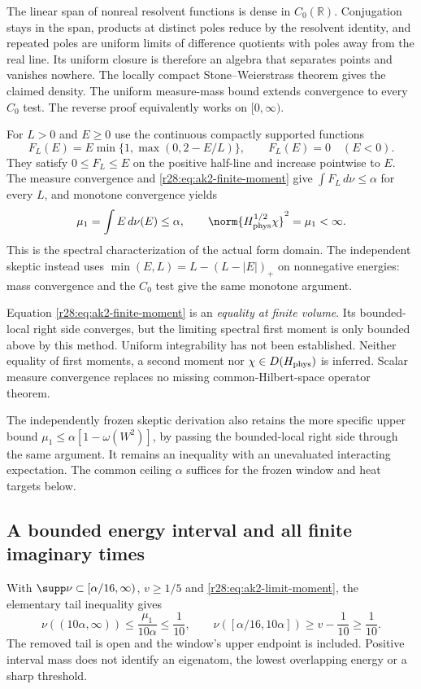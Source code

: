 The linear span of nonreal resolvent functions is dense in $C_0(\mathbb R)$. Conjugation stays in the span, products at distinct poles reduce by the resolvent identity, and repeated poles are uniform limits of difference quotients with poles away from the real line. Its uniform closure is therefore an algebra that separates points and vanishes nowhere. The locally compact Stone--Weierstrass theorem gives the claimed density. The uniform measure-mass bound extends convergence to every $C_0$ test. The reverse proof equivalently works on $[0,\infty)$.

For $L>0$ and $E\ge0$ use the continuous compactly supported functions
\begin{equation}
 F_L(E)=E\min\{1,\max(0,2-E/L)\},\qquad F_L(E)=0\quad(E<0).
\end{equation}
They satisfy $0\le F_L\le E$ on the positive half-line and increase pointwise to $E$. The measure convergence and \eqref{r28:eq:ak2-finite-moment} give $\int F_L\,d\nu\le\alpha$ for every $L$, and monotone convergence yields
\begin{equation}
 \mu_1=\int E\,d\nu(E)\le\alpha,
 \qquad\norm{H_{\rm phys}^{1/2}\chi}^2=\mu_1<\infty.
 \label{r28:eq:ak2-limit-moment}
\end{equation}
This is the spectral characterization of the actual form domain. The independent skeptic instead uses $\min(E,L)=L-(L-|E|)_+$ on nonnegative energies: mass convergence and the $C_0$ test give the same monotone argument.

Equation \eqref{r28:eq:ak2-finite-moment} is an \emph{equality at finite volume}. Its bounded-local right side converges, but the limiting spectral first moment is only bounded above by this method. Uniform integrability has not been established. Neither equality of first moments, a second moment nor $\chi\in D(H_{\rm phys})$ is inferred. Scalar measure convergence replaces no missing common-Hilbert-space operator theorem.

The independently frozen skeptic derivation also retains the more specific upper bound $\mu_1\le\alpha[1-\omega(W^2)]$, by passing the bounded-local right side through the same argument. It remains an inequality with an unevaluated interacting expectation. The common ceiling $\alpha$ suffices for the frozen window and heat targets below.

\subsection{A bounded energy interval and all finite imaginary times}
With $\supp\nu\subset[\alpha/16,\infty)$, $v\ge1/5$ and \eqref{r28:eq:ak2-limit-moment}, the elementary tail inequality gives
\begin{equation}
 \nu((10\alpha,\infty))\le\frac{\mu_1}{10\alpha}\le\frac1{10},
 \qquad
 \nu([\alpha/16,10\alpha])\ge v-\frac1{10}\ge\frac1{10}.
 \label{r28:eq:ak2-window}
\end{equation}
The removed tail is open and the window's upper endpoint is included. Positive interval mass does not identify an eigenatom, the lowest overlapping energy or a sharp threshold.

